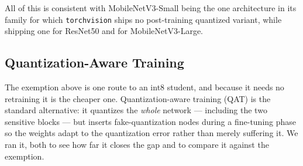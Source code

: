 \documentclass[conference]{IEEEtran}
\begin{document}
All of this is consistent with MobileNetV3-Small being the one architecture in
its family for which \texttt{torchvision} ships no post-training quantized
variant, while shipping one for ResNet50 and for MobileNetV3-Large.

\begin{table}
  \centering
  \caption{Is the int8 collapse caused by our student, or by its architecture?
  The two MobileNetV3-Small arms are replicated over five training seeds on a
  fixed split with matched training budgets, so only the loss differs. Every model
  here --- students and teacher alike --- is quantized over the \emph{same} five
  calibration draws and averaged, so the student SDs are variation across training
  seeds and not calibration noise; the teacher is a single checkpoint, so its SD is
  calibration noise alone. All models
  are quantized through the identical PT2E path
  (per-channel weights, $1{,}024$ calibration images) and evaluated on the Cassava
  single-split test set. The int8 standard deviations are large by nature, not by
  accident: see the text on calibration noise.}
  \label{tab:quant-arch}
\end{table}

\subsection{Quantization-Aware Training}
\label{sec:qat}

The exemption above is one route to an int8 student, and because it needs no
retraining it is the cheaper one. Quantization-aware training (QAT) is the standard
alternative: it quantizes the \emph{whole} network --- including the two sensitive
blocks --- but inserts fake-quantization nodes during a fine-tuning phase so the
weights adapt to the quantization error rather than merely suffering it. We ran it,
both to see how far it closes the gap and to compare it against the exemption.
\end{document}
